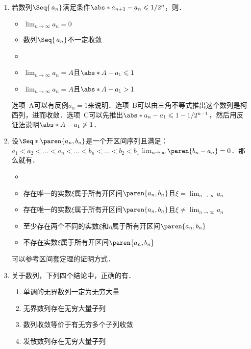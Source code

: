 \begin{enumerate}
\item 若数列\(\Seq{\,a_n}\)满足条件\(\abs*{a_{n+1} - a_n} \le 1/2^n\)，则\uline{\makebox[6em]{}}．
  \begin{itemize}
    \renewcommand{\labelitemi}{\faCircleThin}
  \item \(\lim_{n\to\infty} a_n = 0\)
  \item 数列\(\Seq{\,a_n}\)不一定收敛
    \ifshowsol
    \item[\faCircle]
    \else
    \item
    \fi
    \(\lim_{n\to\infty} a_n = A\)且\(\abs*{A - a_1} \le 1\)
  \item \(\lim_{n\to\infty} a_n = A\)且\(\abs*{A - a_1} > 1\)
  \end{itemize}

  \ifshowsol
    选项~A可以有反例\(a_n = 1\)来说明．选项~B可以由三角不等式推出这个数列是柯西列，进而收敛．选项~C可以先推出\(\abs*{a_n - a_1} \le 1 - 1/2^{n-1}\)，然后用反证法说明\(\abs*{A - a_1} \ngtr 1\)．
  \fi

\item 设\(\Seq*{\paren{a_n, b_n}}\)是一个开区间序列且满足：\(a_1 < a_2 < \dots < a_n < \dots < b_n < \dots < b_2 < b_1\) \(\lim_{n\to\infty} \paren{b_n - a_n} = 0\)．那么就有\uline{\makebox[10em]{}}．
  \begin{itemize}
    \renewcommand{\labelitemi}{\faCircleThin}
    \ifshowsol
    \item[\faCircle]
    \else
    \item
    \fi
    存在唯一的实数\(ξ\)属于所有开区间\(\paren{a_n, b_n}\)且\(ξ = \lim_{n\to\infty} a_n\)
  \item 存在唯一的实数\(ξ\)属于所有开区间\(\paren{a_n, b_n}\)且\(ξ \ne \lim_{n\to\infty} a_n\)
  \item 至少存在两个不同的实数\(ξ\)和\(η\)属于所有开区间\(\paren{a_n, b_n}\)
  \item 不存在实数\(ξ\)属于所有开区间\(\paren{a_n, b_n}\)
  \end{itemize}

  \ifshowsol
    可以参考区间套定理的证明方式．
  \fi

\item 关于数列，下列四个结论中，正确的有\uline{}．
  \begin{enumerate}
    \renewcommand{\labelenumii}{\enumparen{\arabic{enumii}}}
  \item 单调的无界数列一定为无穷大量
  \item 无界数列存在无穷大量子列
  \item 数列收敛等价于有无穷多个子列收敛
  \item 发散数列存在无穷大量子列
  \end{enumerate}


\end{enumerate}
